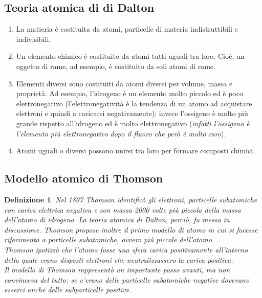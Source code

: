 \documentclass{book}
\newtheorem{defi}{Definizione}[section]
\begin{document}
\subsection{Teoria atomica di di Dalton}
\label{sec:dalton}
\begin{enumerate}
\item La matieria è costituita da atomi, particelle di materia indistruttibili e indivisibili.
\item Un elemento chimico è costituito da atomi tutti uguali tra loro. Cioè, un oggetto di rame, ad esempio,
  è costituito da soli atomi di rame. 
\item Elementi diversi sono costituiti da atomi diversi per volume, massa e proprietà. Ad esempio, l'idrogeno è un
  elemento molto piccolo ed è poco elettronegativo (l’elettronegatività è la tendenza di un atomo ad acquistare
  elettroni e quindi a caricarsi negativamente); invece l’ossigeno è molto più grande rispetto all’idrogeno ed è
  molto elettronegativo ({\it infatti l’ossigeno è l’elemento più elettronegativo dopo il fluoro che però è molto
    raro}).
\item Atomi uguali o diversi possono unirsi tra loro per formare composti chimici.
\end{enumerate}
\newpage
\subsection{Modello atomico di Thomson}
\label{sec:thomson}
\begin{defi}
  Nel 1897 Thomson identificò gli elettroni, particelle subatomiche con carica elettrica negativa e con massa 2000
volte più piccola della massa dell’atomo di idrogeno. La teoria atomica di Dalton, perciò, fu messa in discussione.
Thomson propose inoltre il primo modello di atomo in cui si facesse riferimento a particelle subatomiche, ovvero più
piccole dell’atomo.\\
Thomson ipotizzò che l'atomo fosse una sfera carica positivamente all'interno della quale erano disposti elettroni
che neutralizzassero la carica positiva.\\
Il modello di Thomson rappresentò un importante passo avanti, ma non convinceva del tutto: se c’erano delle
particelle subatomiche negative dovevano esserci anche delle subparticelle positive.
\end{defi}
\end{document}

